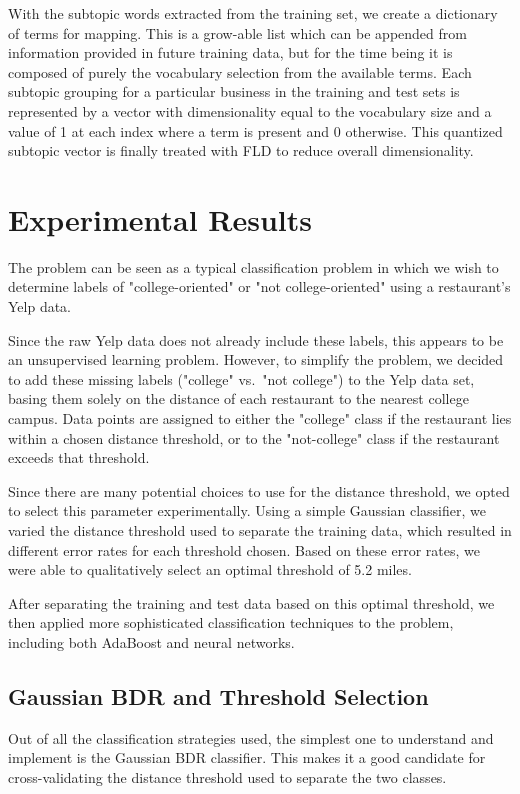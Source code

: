 \documentclass[10pt,twocolumn,letterpaper]{article}
\begin{document}
With the subtopic words extracted from the training set, we create a dictionary
of terms for mapping. This is a grow-able list which can be appended from
information provided in future training data, but for the time being it is
composed of purely the vocabulary selection from the available terms. Each
subtopic grouping for a particular business in the training and test sets is
represented by a vector with dimensionality equal to the vocabulary size and a
value of 1 at each index where a term is present and 0 otherwise. This quantized
subtopic vector is finally treated with FLD to reduce overall dimensionality.

\section{Experimental Results}

The problem can be seen as a typical classification problem in which we wish to
determine labels of "college-oriented" or "not college-oriented" using a
restaurant's Yelp data.

Since the raw Yelp data does not already include these labels, this appears to
be an unsupervised learning problem. However, to simplify the problem, we decided
to add these missing labels ("college" vs.\ "not college") to the Yelp data set,
basing them solely on the distance of each restaurant to the nearest college
campus. Data points are assigned to either the "college" class if the
restaurant lies within a chosen distance threshold, or to the "not-college"
class if the restaurant exceeds that threshold.

Since there are many potential choices to use for the distance threshold, we
opted to select this parameter experimentally. Using a simple Gaussian
classifier, we varied the distance threshold used to separate the training data,
which resulted in different error rates for each threshold chosen. Based on
these error rates, we were able to qualitatively select an optimal threshold of
5.2 miles.

After separating the training and test data based on this optimal threshold, we
then applied more sophisticated classification techniques to the problem,
including both AdaBoost and neural networks.

\subsection{Gaussian BDR and Threshold Selection}

Out of all the classification strategies used, the simplest one to understand
and implement is the Gaussian BDR classifier. This makes it a good candidate for
cross-validating the distance threshold used to separate the two classes.
\end{document}
